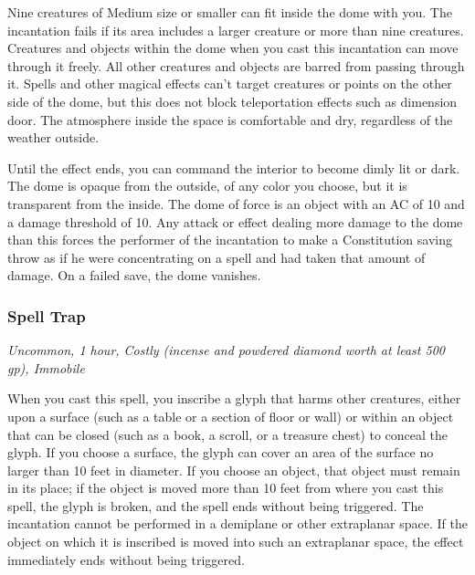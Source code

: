 Nine creatures of Medium size or smaller can fit inside the dome with you. The incantation fails if its area includes a larger creature or more than nine creatures. Creatures and objects within the dome when you cast this incantation can move through it freely. All other creatures and objects are barred from passing through it. Spells and other magical effects can't target creatures or points on the other side of the dome, but this does not block teleportation effects such as dimension door. The atmosphere inside the space is comfortable and dry, regardless of the weather outside.

Until the effect ends, you can command the interior to become dimly lit or dark. The dome is opaque from the outside, of any color you choose, but it is transparent from the inside.
The dome of force is an object with an AC of 10 and a damage threshold of 10. Any attack or effect dealing more damage to the dome than this forces the performer of the incantation to make a Constitution saving throw as if he were concentrating on a spell and had taken that amount of damage. On a failed save, the dome vanishes.

\subsubsection{Spell Trap}
\textit{Uncommon, 1 hour, Costly (incense and powdered diamond worth at least 500 gp), Immobile}

When you cast this spell, you inscribe a glyph that harms other creatures, either upon a surface (such as a table or a section of floor or wall) or within an object that can be closed (such as a book, a scroll, or a treasure chest) to conceal the glyph. If you choose a surface, the glyph can cover an area of the surface no larger than 10 feet in diameter. If you choose an object, that object must remain in its place; if the object is moved more than 10 feet from where you cast this spell, the glyph is broken, and the spell ends without being triggered. The incantation cannot be performed in a demiplane or other extraplanar space. If the object on which it is inscribed is moved into such an extraplanar space, the effect immediately ends without being triggered.

